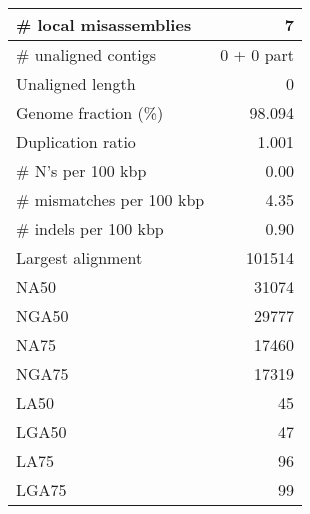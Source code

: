 \documentclass[12pt,a4paper]{article}
\begin{document}
\begin{table}[ht]
\begin{center}
\begin{tabular}{|l*{1}{|r}|}
\# local misassemblies & 7 \\ \hline
\# unaligned contigs & 0 + 0 part \\ \hline
Unaligned length & 0 \\ \hline
Genome fraction (\%) & 98.094 \\ \hline
Duplication ratio & 1.001 \\ \hline
\# N's per 100 kbp & 0.00 \\ \hline
\# mismatches per 100 kbp & 4.35 \\ \hline
\# indels per 100 kbp & 0.90 \\ \hline
Largest alignment & 101514 \\ \hline
NA50 & 31074 \\ \hline
NGA50 & 29777 \\ \hline
NA75 & 17460 \\ \hline
NGA75 & 17319 \\ \hline
LA50 & 45 \\ \hline
LGA50 & 47 \\ \hline
LA75 & 96 \\ \hline
LGA75 & 99 \\ \hline
\end{tabular}
\end{center}
\end{table}
\end{document}
